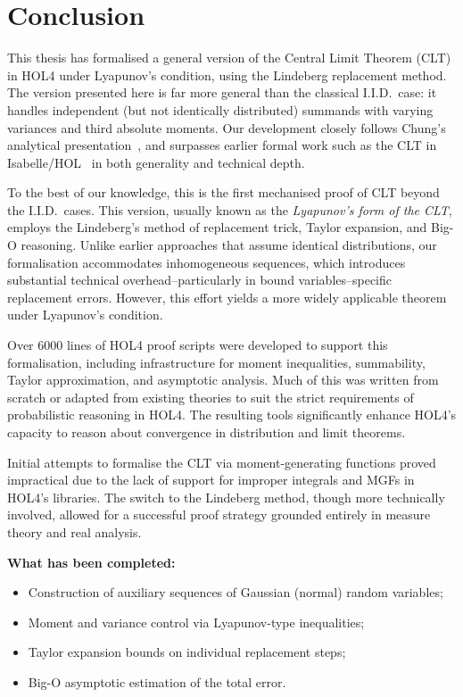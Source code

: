 \chapter{Conclusion}
\label{concl}

This thesis has formalised a general version of the Central Limit Theorem (CLT) in HOL4 under Lyapunov's condition, using the Lindeberg replacement method. The version presented here is far more general than the classical I.I.D.~case: it handles independent (but not identically distributed) summands with varying variances and third absolute moments. Our development closely follows Chung's analytical presentation~\cite{Chung:2001}, and surpasses earlier formal work such as the CLT in Isabelle/HOL~\cite{serafin2015formally} in both generality and technical depth.

To the best of our knowledge, this is the first mechanised proof of CLT beyond the I.I.D.~cases.
This version, usually known as the \emph{Lyapunov's form of the CLT}, employs the Lindeberg's method of replacement trick, Taylor expansion, and Big-O reasoning. Unlike earlier approaches that assume identical distributions, our formalisation accommodates inhomogeneous sequences, which introduces substantial technical overhead--particularly in bound variables--specific replacement errors. However, this effort yields a more widely applicable theorem under Lyapunov’s condition.

Over 6000 lines of HOL4 proof scripts were developed to support this formalisation, including infrastructure for moment inequalities, summability, Taylor approximation, and asymptotic analysis. Much of this was written from scratch or adapted from existing theories to suit the strict requirements of probabilistic reasoning in HOL4. The resulting tools significantly enhance HOL4’s capacity to reason about convergence in distribution and limit theorems.

Initial attempts to formalise the CLT via moment-generating functions proved impractical due to the lack of support for improper integrals and MGFs in HOL4’s libraries. The switch to the Lindeberg method, though more technically involved, allowed for a successful proof strategy grounded entirely in measure theory and real analysis.

\medskip

\textbf{What has been completed:}
\begin{itemize}
    \item Construction of auxiliary sequences of Gaussian (normal) random variables;
    \item Moment and variance control via Lyapunov-type inequalities;
    \item Taylor expansion bounds on individual replacement steps;
    \item Big-O asymptotic estimation of the total error.
\end{itemize}

